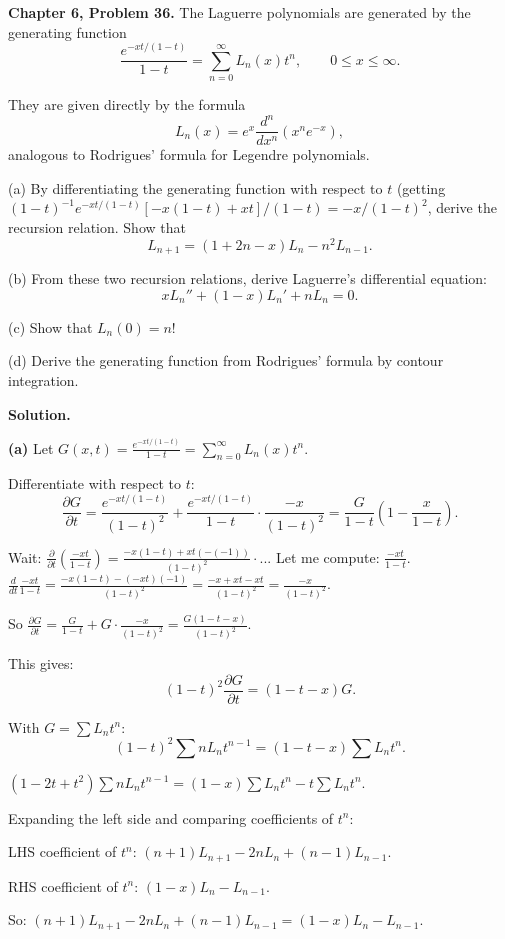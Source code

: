 \documentclass[12pt]{article}
\begin{document}
\textbf{Chapter 6, Problem 36.} The Laguerre polynomials are generated by the generating function
\[
\frac{e^{-xt/(1-t)}}{1-t} = \sum_{n=0}^{\infty}L_n(x)t^n, \qquad 0 \leq x \leq \infty.
\]

They are given directly by the formula
\[
L_n(x) = e^x\frac{d^n}{dx^n}(x^ne^{-x}),
\]
analogous to Rodrigues' formula for Legendre polynomials.

(a) By differentiating the generating function with respect to $t$ (getting $(1-t)^{-1}e^{-xt/(1-t)}[-x(1-t)+xt]/(1-t) = -x/(1-t)^2$, derive the recursion relation. Show that
\[
L_{n+1} = (1+2n-x)L_n - n^2L_{n-1}.
\]

(b) From these two recursion relations, derive Laguerre's differential equation:
\[
xL_n'' + (1-x)L_n' + nL_n = 0.
\]

(c) Show that $L_n(0) = n!$

(d) Derive the generating function from Rodrigues' formula by contour integration.

\bigskip
\textbf{Solution.}

\textbf{(a)} Let $G(x,t) = \frac{e^{-xt/(1-t)}}{1-t} = \sum_{n=0}^{\infty}L_n(x)t^n$.

Differentiate with respect to $t$:
\[
\frac{\partial G}{\partial t} = \frac{e^{-xt/(1-t)}}{(1-t)^2} + \frac{e^{-xt/(1-t)}}{1-t}\cdot\frac{-x}{(1-t)^2} = \frac{G}{1-t}\left(1-\frac{x}{1-t}\right).
\]

Wait: $\frac{\partial}{\partial t}\left(\frac{-xt}{1-t}\right) = \frac{-x(1-t)+xt(-(-1))}{(1-t)^2} \cdot$... Let me compute: $\frac{-xt}{1-t}$. $\frac{d}{dt}\frac{-xt}{1-t} = \frac{-x(1-t)-(-xt)(-1)}{(1-t)^2} = \frac{-x+xt-xt}{(1-t)^2} = \frac{-x}{(1-t)^2}$.

So $\frac{\partial G}{\partial t} = \frac{G}{1-t} + G\cdot\frac{-x}{(1-t)^2} = \frac{G(1-t-x)}{(1-t)^2}$.

This gives:
\[
(1-t)^2\frac{\partial G}{\partial t} = (1-t-x)G.
\]

With $G = \sum L_n t^n$:
\[
(1-t)^2\sum nL_n t^{n-1} = (1-t-x)\sum L_n t^n.
\]

$(1-2t+t^2)\sum nL_n t^{n-1} = (1-x)\sum L_n t^n - t\sum L_n t^n$.

Expanding the left side and comparing coefficients of $t^n$:

LHS coefficient of $t^n$: $(n+1)L_{n+1} - 2nL_n + (n-1)L_{n-1}$.

RHS coefficient of $t^n$: $(1-x)L_n - L_{n-1}$.

So: $(n+1)L_{n+1} - 2nL_n + (n-1)L_{n-1} = (1-x)L_n - L_{n-1}$.
\end{document}
